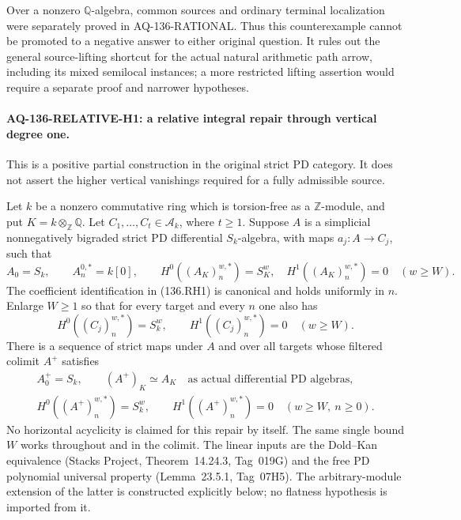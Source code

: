 Over a nonzero $\mathbb Q$-algebra, common sources and ordinary
terminal localization were separately proved in AQ-136-RATIONAL.
Thus this counterexample cannot be promoted to a negative answer
to either original question. It rules out the general source-lifting
shortcut for the actual natural arithmetic path arrow, including
its mixed semilocal instances; a more restricted lifting assertion
would require a separate proof and narrower hypotheses.

\paragraph{AQ-136-RELATIVE-H1: a relative integral repair through vertical degree one.}
This is a positive partial construction in the original strict PD
category. It does not assert the higher vertical vanishings required
for a fully admissible source.

Let $k$ be a nonzero commutative ring which is torsion-free as a
$\mathbb Z$-module, and put $K=k\otimes_{\mathbb Z}\mathbb Q$.
Let $C_1,\ldots,C_t\in\mathcal A_k$, where $t\ge1$.
Suppose $A$ is a simplicial nonnegatively bigraded strict PD
differential $S_k$-algebra, with maps $a_j:A\to C_j$, such that
\[
 A_0=S_k,\qquad A_n^{0,*}=k[0],\qquad
 H^0((A_K)_n^{w,*})=S_K^w,\quad
 H^1((A_K)_n^{w,*})=0\quad(w\ge W).                       \tag{136.RH1}
\]
The coefficient identification in (136.RH1) is canonical and
holds uniformly in $n$. Enlarge $W\ge1$ so that for every target
and every $n$ one also has
\[
 H^0((C_j)_n^{w,*})=S_k^w,
       \qquad H^1((C_j)_n^{w,*})=0\quad(w\ge W).           \tag{136.RH2}
\]
There is a sequence of strict maps under $A$ and over all targets
whose filtered colimit $A^+$ satisfies
\[
 \begin{gathered}
 A^+_0=S_k,\qquad (A^+)_K\simeq A_K
                   \quad\text{as actual differential PD algebras},\\
 H^0((A^+)_n^{w,*})=S_k^w,\qquad
 H^1((A^+)_n^{w,*})=0\quad(w\ge W,\ n\ge0).
 \end{gathered}                                             \tag{136.RH3}
\]
No horizontal acyclicity is claimed for this repair by itself.
The same single bound $W$ works throughout and in the colimit.
The linear inputs are the Dold--Kan equivalence
(Stacks Project, Theorem~14.24.3, Tag~019G) and the free PD
polynomial universal property (Lemma~23.5.1, Tag~07H5).
The arbitrary-module extension of the latter is constructed
explicitly below; no flatness hypothesis is imported from it.


